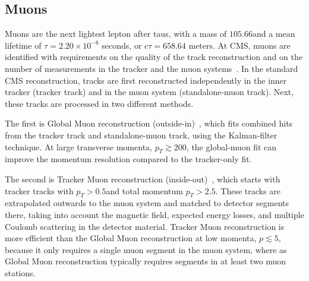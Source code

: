 \subsection{Muons}
\label{section:ch-5-muon-reconstruction}
Muons are the next lightest lepton after taus, with a mass of $105.66$\MeV and a mean lifetime of $\tau = 2.20 \times 10^{-6}$ seconds, or $c\tau = 658.64$ meters. At CMS, muons are identified with requirements on the quality of the track reconstruction and on the number of measurements in the tracker and the muon systems~\citep{CMS-MUO-10-004}. In the standard CMS reconstruction, tracks are first reconstructed independently in the inner tracker (tracker track) and in the muon system (standalone-muon track). Next, these tracks are processed in two different methods.

The first is Global Muon reconstruction (outside-in)~\citep{CMS-MUO-10-004}, which fits combined hits from the tracker track and standalone-muon track, using the Kalman-filter technique. At large transverse momenta, $p_{T} \gtrsim 200$\GeV, the global-muon fit can improve the momentum resolution compared to the tracker-only fit. 

The second is Tracker Muon reconstruction (inside-out)~\citep{CMS-MUO-10-004}, which starts with tracker tracks with $p_{T} > 0.5$\GeV and total momentum $p_{T} > 2.5$\GeV. These tracks are extrapolated outwards to the muon system and matched to detector segments there, taking into account the magnetic field, expected energy losses, and multiple Coulomb scattering in the detector material. Tracker Muon reconstruction is more efficient than the Global Muon reconstruction at low momenta, $p \lesssim 5$\GeV, because it only requires a single muon segment in the muon system, where as Global Muon reconstruction typically requires segments in at least two muon stations.

